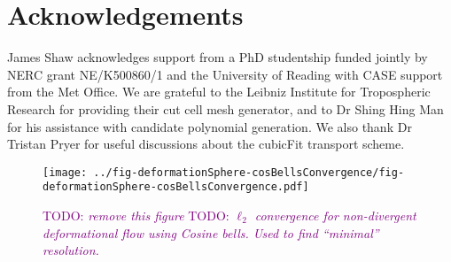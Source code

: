 \documentclass[times]{elsarticle}
\newcommand{\TODO}[1]{\textcolor{purple}{TODO: \emph{#1}}}
\begin{document}


\section{Acknowledgements}
James Shaw acknowledges support from a PhD studentship funded jointly by NERC grant NE/K500860/1 and the University of Reading with CASE support from the Met Office.
We are grateful to the Leibniz Institute for Tropospheric Research for providing their cut cell mesh generator, and to Dr Shing Hing Man for his assistance with candidate polynomial generation.  We also thank Dr Tristan Pryer for useful discussions about the cubicFit transport scheme.







\begin{figure}
	\centering
	\texttt{[image: ../fig-deformationSphere-cosBellsConvergence/fig-deformationSphere-cosBellsConvergence.pdf]}
	\caption{\TODO{remove this figure}  \TODO{$\ell_2$ convergence for non-divergent deformational flow using Cosine bells.  Used to find ``minimal'' resolution.}}
\end{figure}
\end{document}
